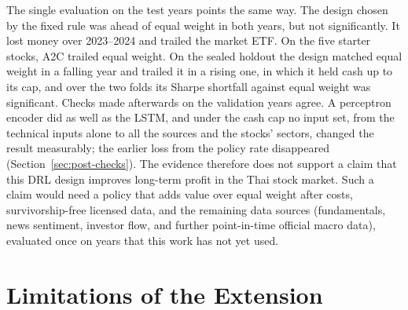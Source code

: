 The single evaluation on the test years points the same way. The design chosen by the fixed rule was
ahead of equal weight in both years, but not significantly. It lost money over 2023--2024 and trailed
the market ETF. On the five starter stocks, A2C trailed equal weight. On the sealed holdout the design
matched equal weight in a falling year and trailed it in a rising one, in which it held cash up to its
cap, and over the two folds its Sharpe shortfall against equal weight was significant.
Checks made afterwards on the validation years agree. A perceptron encoder did as well as the LSTM,
and under the cash cap no input set, from the technical inputs alone to all the sources and the stocks'
sectors, changed the result measurably; the earlier loss from the policy rate disappeared (Section~\ref{sec:post-checks}).
The evidence therefore does not support a claim that this DRL design improves long-term profit in the
Thai stock market. Such a claim would need a policy that adds value over equal weight after costs,
survivorship-free licensed data, and the remaining data sources (fundamentals, news sentiment,
investor flow, and further point-in-time official macro data), evaluated once on years that this work
has not yet used.

\section{Limitations of the Extension}
\label{sec:ext-limitations}

